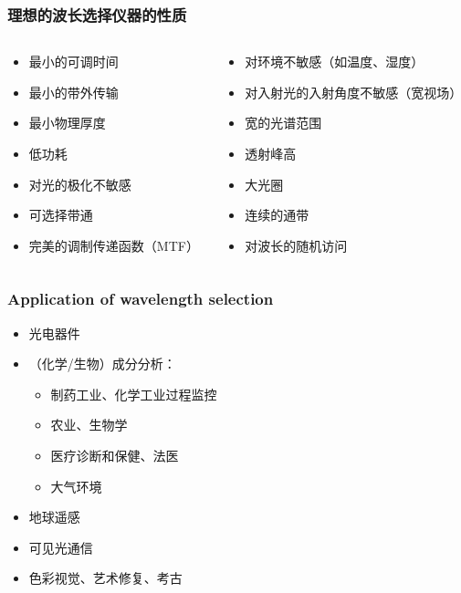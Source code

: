 \begin{frame}[c]
    \frametitle{理想的波长选择仪器的性质}
    \begin{columns}
        \begin{column}{.5\textwidth}
            \begin{itemize}
                \item 最小的可调时间
                \item 最小的带外传输
                \item 最小物理厚度
                \item 低功耗
                \item 对光的极化不敏感
                \item 可选择带通
                \item 完美的调制传递函数（MTF）
            \end{itemize}
        \end{column}
        \begin{column}{.5\textwidth}
            \begin{itemize}
                \item 对环境不敏感（如温度、湿度）
                \item 对入射光的入射角度不敏感（宽视场）
                \item 宽的光谱范围
                \item 透射峰高
                \item 大光圈
                \item 连续的通带
                \item 对波长的随机访问
            \end{itemize}
        \end{column}
    \end{columns}
\end{frame}

\begin{frame}[c]
    \frametitle{Application of wavelength selection}
    \begin{itemize}
        \item 光电器件
        \item （化学/生物）成分分析：\begin{itemize}
                  \item 制药工业、化学工业过程监控
                  \item 农业、生物学
                  \item 医疗诊断和保健、法医
                  \item 大气环境
              \end{itemize}
        \item 地球遥感
        \item 可见光通信
        \item 色彩视觉、艺术修复、考古
    \end{itemize}
\end{frame}

